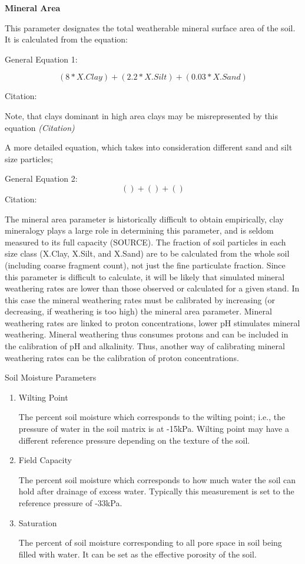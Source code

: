 \documentclass[
]{article}
\begin{document}
\textbf{Mineral Area}

This parameter designates the total weatherable mineral surface area of
the soil. It is calculated from the equation:

General Equation 1:

\[
(8*X.Clay)+(2.2*X.Silt)+(0.03*X.Sand)
\]

Citation:

Note, that clays dominant in high area clays may be misrepresented by
this equation \emph{(Citation)}

A more detailed equation, which takes into consideration different sand
and silt size particles;

General Equation 2: \[
()+()+()
\] Citation:

The mineral area parameter is historically difficult to obtain
empirically, clay mineralogy plays a large role in determining this
parameter, and is seldom measured to its full capacity (SOURCE). The
fraction of soil particles in each size class (X.Clay, X.Silt, and
X.Sand) are to be calculated from the whole soil (including coarse
fragment count), not just the fine particulate fraction. Since this
parameter is difficult to calculate, it will be likely that simulated
mineral weathering rates are lower than those observed or calculated for
a given stand. In this case the mineral weathering rates must be
calibrated by increasing (or decreasing, if weathering is too high) the
mineral area parameter. Mineral weathering rates are linked to proton
concentrations, lower pH stimulates mineral weathering. Mineral
weathering thus consumes protons and can be included in the calibration
of pH and alkalinity. Thus, another way of calibrating mineral
weathering rates can be the calibration of proton concentrations.

Soil Moisture Parameters

\begin{enumerate}
\def\labelenumi{\arabic{enumi}.}
\item
  Wilting Point

  The percent soil moisture which corresponds to the wilting point;
  i.e., the pressure of water in the soil matrix is at -15kPa. Wilting
  point may have a different reference pressure depending on the texture
  of the soil.
\item
  Field Capacity

  The percent soil moisture which corresponds to how much water the soil
  can hold after drainage of excess water. Typically this measurement is
  set to the reference pressure of -33kPa.
\item
  Saturation

  The percent of soil moisture corresponding to all pore space in soil
  being filled with water. It can be set as the effective porosity of
  the soil.
\end{enumerate}
\end{document}
